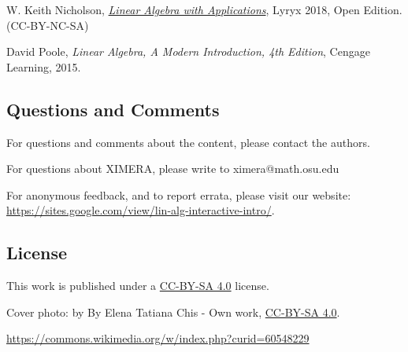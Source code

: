 \documentclass{ximera}
\begin{document}
W. Keith Nicholson, \href{https://open.umn.edu/opentextbooks/textbooks/linear-algebra-with-applications}{\it Linear Algebra with Applications}, Lyryx 2018, Open Edition. (CC-BY-NC-SA)

David Poole, {\it Linear Algebra, A Modern Introduction, 4th Edition}, Cengage Learning, 2015.  


\subsection{Questions and Comments}
For questions and comments about the content, please contact the authors.

For questions about XIMERA, please write to ximera@math.osu.edu

For anonymous feedback, and to report errata, please visit our website: \href{https://sites.google.com/view/lin-alg-interactive-intro/}{https://sites.google.com/view/lin-alg-interactive-intro/}.

\subsection{License}
This work is published under a \href{https://creativecommons.org/licenses/by-sa/4.0/deed.en}{CC-BY-SA 4.0} license.

Cover photo:   by By Elena Tatiana Chis - Own work, \href{https://creativecommons.org/licenses/by-sa/4.0/deed.en}{CC-BY-SA 4.0}.  

\href{https://commons.wikimedia.org/w/index.php?curid=60548229}{https://commons.wikimedia.org/w/index.php?curid=60548229}
\end{document}
